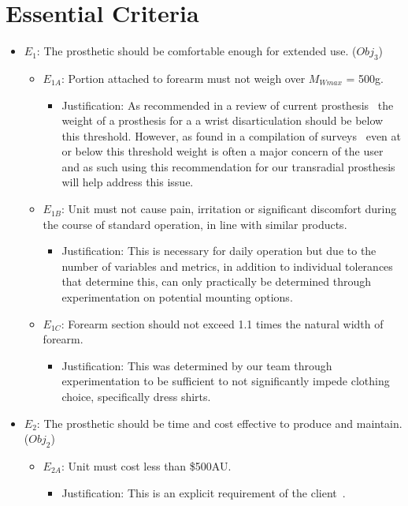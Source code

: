 \documentclass[12pt,3p]{elsarticle}
\begin{document}
\section{Essential Criteria}
\label{sec2}
\begin{itemize}
\item $E_1$: The prosthetic should be comfortable enough for extended use. ($Obj_3$)
	\begin{itemize}
	
	\item $E_{1A}$: Portion attached to forearm must not weigh over $M_{Wmax}$ = 500g.
		\begin{itemize}
		\item Justification: As recommended in a review of current prosthesis~\cite{Belter} the weight of a prosthesis for a a wrist disarticulation should be below this threshold. However, as found in a compilation of surveys~\cite{Cordella} even at or below this threshold weight is often a major concern of the user and as such using this recommendation for our transradial prosthesis will help address this issue.
		\end{itemize}
		
	\item $E_{1B}$: Unit must not cause pain, irritation or significant discomfort during the course of standard operation, in line with similar products.
		\begin{itemize}
		\item Justification: This is necessary for daily operation but due to the number of variables and metrics, in addition to individual tolerances that determine this, can only practically be determined through experimentation on potential mounting options.
		\end{itemize}
		
	\item $E_{1C}$: Forearm section should not exceed 1.1 times the natural width of forearm.
		\begin{itemize}
		\item Justification: This was determined by our team through experimentation to be sufficient to not significantly impede clothing choice, specifically dress shirts.
		\end{itemize}
		
	\end{itemize}
	
\item $E_2$: The prosthetic should be time and cost effective to produce and maintain. ($Obj_2$)
	\begin{itemize}
	\item $E_{2A}$: Unit must cost less than \$500AU.
		\begin{itemize}
		\item Justification: This is an explicit requirement of the client~\cite{Walbran}.
		\end{itemize}
		

\end{itemize}
\end{itemize}
\end{document}

